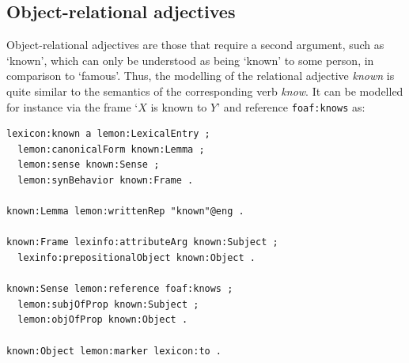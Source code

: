 \documentclass[11pt]{article}
\begin{document}

\subsection{Object-relational adjectives}

Object-relational adjectives are those that require a second argument, such as `known', which
can only be understood as being `known' to some person, in comparison to `famous'.
Thus, the modelling of the relational adjective \emph{known} is quite similar to the semantics of the corresponding verb \emph{know}. It can be modelled for instance via the frame `$X$ is known to $Y$' and
reference {\tt foaf:knows} as:
 
\begin{small}\begin{verbatim}
lexicon:known a lemon:LexicalEntry ;
  lemon:canonicalForm known:Lemma ;
  lemon:sense known:Sense ;
  lemon:synBehavior known:Frame .

known:Lemma lemon:writtenRep "known"@eng .

known:Frame lexinfo:attributeArg known:Subject ;
  lexinfo:prepositionalObject known:Object .

known:Sense lemon:reference foaf:knows ;
  lemon:subjOfProp known:Subject ;
  lemon:objOfProp known:Object .
	
known:Object lemon:marker lexicon:to .
\end{verbatim}\end{small}

%
%
%
\end{document}
